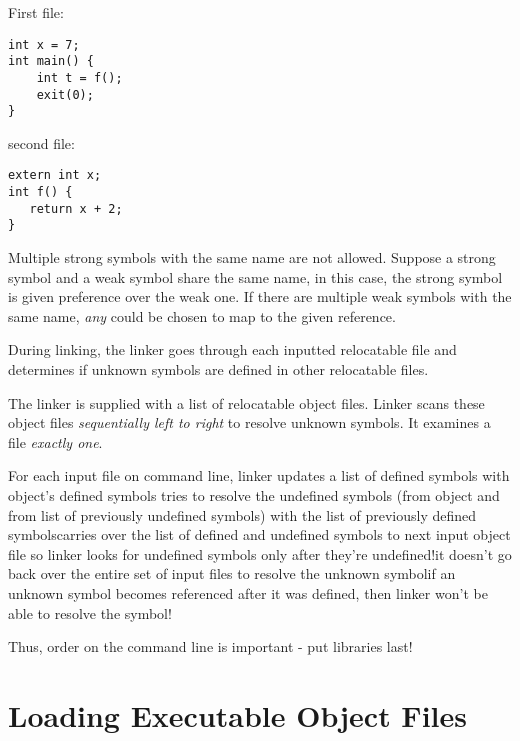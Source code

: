 \frmrule

\begin{example}

First file:
\begin{lstlisting}
int x = 7;
int main() {
    int t = f();
    exit(0);
}
\end{lstlisting}

second file:
\begin{lstlisting}
extern int x;
int f() {
   return x + 2;
}
\end{lstlisting}


\end{example}

\frmrule



Multiple strong symbols with the same name are not allowed. 
Suppose a strong symbol and a weak symbol share the same name, 
in this case, the strong symbol is given preference over the weak one.
If there are multiple weak symbols with the same name, 
\textit{any} could be chosen to map to the given reference.

\frmrule

During linking, the linker goes through each inputted relocatable file and 
determines if unknown symbols are defined in other relocatable files.

The linker is supplied with a list of relocatable object files. 
Linker scans these object files \textit{sequentially left to right} 
to resolve unknown symbols. It examines a file \textit{exactly one}. 

For each input file on command line, linker
updates a list of defined symbols with object’s defined symbols
tries to resolve the undefined symbols (from object and from list of 
previously undefined symbols) with the list of previously defined 
symbolscarries over the list of defined and undefined symbols to next input 
object file so linker looks for undefined symbols only after they’re 
undefined!it doesn’t go back over the entire set of input files to resolve the 
unknown symbolif an unknown symbol becomes referenced after it was defined, then 
linker won’t be able to resolve the symbol!

Thus, order on the command line is important - put libraries last!



\section{Loading Executable Object Files}



